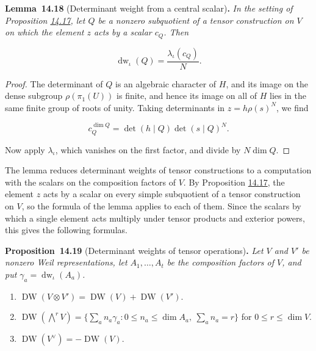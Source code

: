 \documentclass[11pt]{article}
\newenvironment{bpstatement}[2]{\par\addvspace{0.6\baselineskip}\noindent\textbf{#1}#2\textbf{.}\enspace\ignorespaces}
  {\par\addvspace{0.4\baselineskip}}
\newenvironment{bpstatementit}[2]{\begin{bpstatement}{#1}{#2}\itshape\ignorespaces}{\end{bpstatement}}
\begin{document}
\label{bp58}%
\begin{bpstatementit}{Lemma~14.18}{ (Determinant weight from a central scalar)}
In the setting of Proposition \hyperref[bp54]{14.17}, let \(Q\) be a nonzero subquotient of a tensor construction on \(V\) on which the element \(z\) acts by a scalar \(c_Q\). Then

\[
\operatorname{dw}_\iota(Q)=\frac{\lambda_\iota(c_Q)}{N}.
\]
\end{bpstatementit}

\begin{proof}[{Proof}]\label{bp59}%
The determinant of \(Q\) is an algebraic character of \(H\), and its image on the dense subgroup \(\rho(\pi_1(U))\) is finite, and hence its image on all of \(H\) lies in the same finite group of roots of unity. Taking determinants in \(z=h\rho(s)^N\), we find

\[
c_Q^{\dim Q}=\det(h\mid Q)\det(s\mid Q)^N.
\]

Now apply \(\lambda_\iota\), which vanishes on the first factor, and divide by \(N\dim Q\).
\end{proof}

\label{bp60}%
The lemma reduces determinant weights of tensor constructions to a computation with the scalars on the composition factors of \(V\). By Proposition \hyperref[bp54]{14.17}, the element \(z\) acts by a scalar on every simple subquotient of a tensor construction on \(V\), so the formula of the lemma applies to each of them. Since the scalars by which a single element acts multiply under tensor products and exterior powers, this gives the following formulas.

\label{bp61}%
\begin{bpstatementit}{Proposition~14.19}{ (Determinant weights of tensor operations)}
Let \(V\) and \(V'\) be nonzero Weil representations, let \(A_1,\ldots,A_t\) be the composition factors of \(V\), and put \(\gamma_a=\operatorname{dw}_\iota(A_a)\).

\begin{enumerate}
\item \(\operatorname{DW}(V\otimes V')=\operatorname{DW}(V)+\operatorname{DW}(V')\).
\item \(\operatorname{DW}(\bigwedge^rV)=\bigl\{\sum_an_a\gamma_a :
      0\le n_a\le\dim A_a,\ \sum_an_a=r\bigr\}\) for \(0\le r\le\dim V\).
\item \(\operatorname{DW}(V^\vee)=-\operatorname{DW}(V)\).
\end{enumerate}
\end{bpstatementit}
\end{document}

